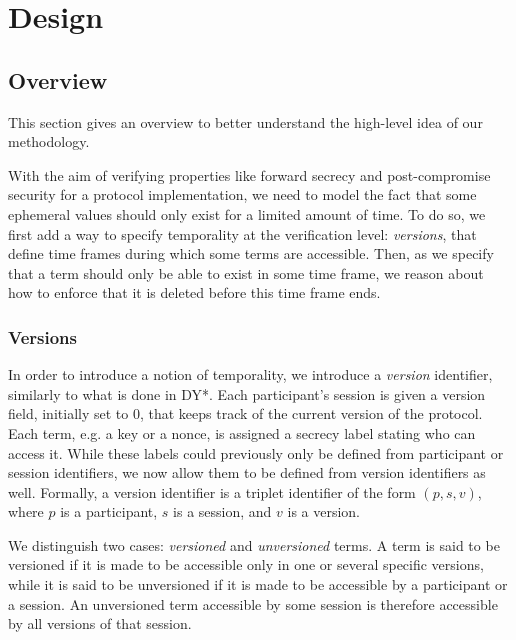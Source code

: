 \chapter{Design}


\section{Overview}

This section gives an overview to better understand the high-level idea of our methodology.

With the aim of verifying properties like forward secrecy and post-compromise security for a protocol implementation, we need to model the fact that some ephemeral values should only exist for a limited amount of time.
To do so, we first add a way to specify temporality at the verification level: \emph{versions}, that define time frames during which some terms are accessible.
Then, as we specify that a term should only be able to exist in some time frame, we reason about how to enforce that it is deleted before this time frame ends.

\subsection{Versions}

In order to introduce a notion of temporality, we introduce a \emph{version} identifier, similarly to what is done in DY*. Each participant's session is given a version field, initially set to $0$, that keeps track of the current version of the protocol.
Each term, e.g. a key or a nonce, is assigned a secrecy label stating who can access it. While these labels could previously only be defined from participant or session identifiers, we now allow them to be defined from version identifiers as well. Formally, a version identifier is a triplet identifier of the form $(p, s, v)$, where $p$ is a participant, $s$ is a session, and $v$ is a version.

We distinguish two cases: \emph{versioned} and \emph{unversioned} terms.
A term is said to be versioned if it is made to be accessible only in one or several specific versions, while it is said to be unversioned if it is made to be accessible by a participant or a session. 
An unversioned term accessible by some session is therefore accessible by all versions of that session.

